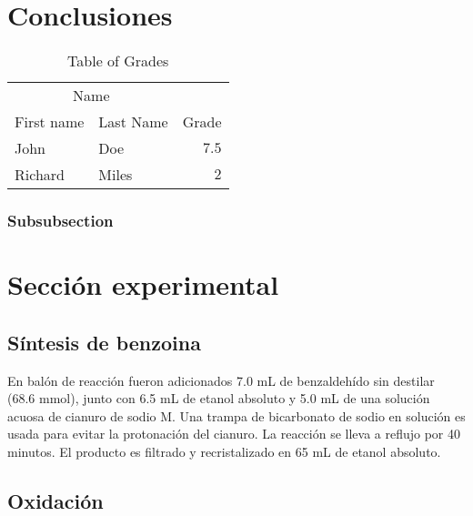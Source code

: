 \documentclass[fleqn,10pt]{SelfArx}
\begin{document}
\section{Conclusiones}

\lipsum[10] %

\begin{table}[hbt]
\caption{Table of Grades}
\centering
\begin{tabular}{llr}
\toprule
\multicolumn{2}{c}{Name} \\
\cmidrule(r){1-2}
First name & Last Name & Grade \\
\midrule
John & Doe & $7.5$ \\
Richard & Miles & $2$ \\
\bottomrule
\end{tabular}
\label{tab:label}
\end{table}

\subsubsection{Subsubsection}

\lipsum[12] %

\section{Secci\'on experimental}
\subsection{S\'intesis de benzoina}
En bal\'on de reacci\'on fueron adicionados 7.0 mL de benzaldeh\'ido sin destilar (68.6 mmol), junto con 6.5 mL de etanol absoluto y 5.0 mL de una soluci\'on acuosa de cianuro de sodio M. Una trampa de bicarbonato de sodio en soluci\'on es usada para evitar la protonaci\'on del cianuro. La reacci\'on se lleva a reflujo por 40 minutos. El producto es filtrado y recristalizado en 65 mL de etanol absoluto.


\subsection{Oxidaci\'on}



\end{document}
